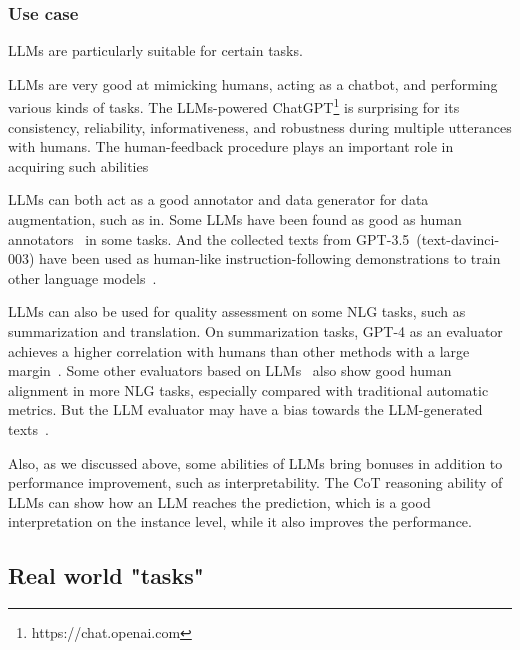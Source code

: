 \documentclass[manuscript,screen, nonacm]{acmart}
\begin{document}
\subsubsection{Use case} LLMs are particularly suitable for certain tasks. 

 
LLMs are very good at mimicking humans, acting as a chatbot, and performing various kinds of tasks. The LLMs-powered ChatGPT\footnote{https://chat.openai.com} is surprising for its consistency, reliability, informativeness, and robustness during multiple utterances with humans. The human-feedback procedure  plays an important role in acquiring such abilities
 

LLMs can both act as a good annotator and data generator for data augmentation, such as in\cite{yoo2021gpt3mix,dai2023chataug,ding2022gpt,tang2023does, yuan2023llm}. Some LLMs have been found as good as human annotators~\cite{gilardi2023chatgpt} in some tasks. And the collected texts from GPT-3.5~(text-davinci-003) have been used as human-like instruction-following demonstrations to train other language models~\cite{alpaca}. 

LLMs can also be used for quality assessment on some NLG tasks, such as summarization and translation. On summarization tasks, GPT-4 as an evaluator achieves a higher correlation with humans than other methods with a large margin~\cite{liu2023gpteval}. Some other evaluators based on LLMs~\cite{kocmi2023large, fu2023gptscore,liu2023gpteval,wang2023chatgpt} also show good human alignment in more NLG tasks, especially compared with traditional automatic metrics. But the LLM evaluator may have a bias towards the LLM-generated texts~\cite{liu2023gpteval}.

Also, as we discussed above, some abilities of LLMs bring bonuses in addition to performance improvement, such as interpretability. The CoT reasoning ability of LLMs can show how an LLM reaches the prediction, which is a good interpretation on the instance level, while it also improves the performance. 




  

\subsection{Real world "tasks"}
\end{document}
